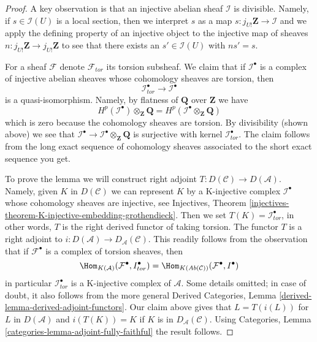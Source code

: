 \begin{proof}
A key observation is that an injective abelian sheaf $\mathcal{I}$
is divisible. Namely, if $s \in \mathcal{I}(U)$ is a local section,
then we interpret $s$ as a map
$s : j_{U!}\mathbf{Z} \to \mathcal{I}$ and we apply the
defining property of an injective object to
the injective map of sheaves $n : j_{U!}\mathbf{Z} \to j_{U!}\mathbf{Z}$
to see that there exists an $s' \in \mathcal{I}(U)$ with $ns' = s$.

\medskip\noindent
For a sheaf $\mathcal{F}$ denote $\mathcal{F}_{tor}$ its torsion subsheaf.
We claim that if $\mathcal{I}^\bullet$ is a complex of injective abelian
sheaves whose cohomology sheaves are torsion, then
$$
\mathcal{I}^\bullet_{tor} \to \mathcal{I}^\bullet
$$
is a quasi-isomorphism. Namely, by flatness of $\mathbf{Q}$ over $\mathbf{Z}$
we have
$$
H^p(\mathcal{I}^\bullet) \otimes_\mathbf{Z} \mathbf{Q} =
H^p(\mathcal{I}^\bullet \otimes_\mathbf{Z} \mathbf{Q})
$$
which is zero because the cohomology sheaves are torsion.
By divisibility (shown above) we see that
$\mathcal{I}^\bullet \to \mathcal{I}^\bullet \otimes_\mathbf{Z} \mathbf{Q}$
is surjective with kernel $\mathcal{I}^\bullet_{tor}$.
The claim follows from the long exact sequence of cohomology sheaves
associated to the short exact sequence you get.

\medskip\noindent
To prove the lemma we will construct right adjoint
$T : D(\mathcal{C}) \to D(\mathcal{A})$. Namely, given $K$
in $D(\mathcal{C})$ we can represent $K$ by a K-injective complex
$\mathcal{I}^\bullet$ whose cohomology sheaves are injective, see
Injectives, Theorem
\ref{injectives-theorem-K-injective-embedding-grothendieck}.
Then we set $T(K) = \mathcal{I}^\bullet_{tor}$, in other words,
$T$ is the right derived functor of taking torsion.
The functor $T$ is a right adjoint to
$i : D(\mathcal{A}) \to D_\mathcal{A}(\mathcal{C})$.
This readily follows from the observation that
if $\mathcal{F}^\bullet$ is a complex of torsion sheaves, then
$$
\Hom_{K(\mathcal{A})}(\mathcal{F}^\bullet, I^\bullet_{tor}) =
\Hom_{K(\textit{Ab}(\mathcal{C}))}(\mathcal{F}^\bullet, I^\bullet)
$$
in particular $\mathcal{I}^\bullet_{tor}$ is a K-injective complex
of $\mathcal{A}$. Some details omitted; in case of doubt, it also
follows from the more general
Derived Categories, Lemma \ref{derived-lemma-derived-adjoint-functors}.
Our claim above gives that $L = T(i(L))$ for $L$ in $D(\mathcal{A})$
and $i(T(K)) = K$ if $K$ is in $D_\mathcal{A}(\mathcal{C})$.
Using Categories, Lemma \ref{categories-lemma-adjoint-fully-faithful}
the result follows.
\end{proof}




